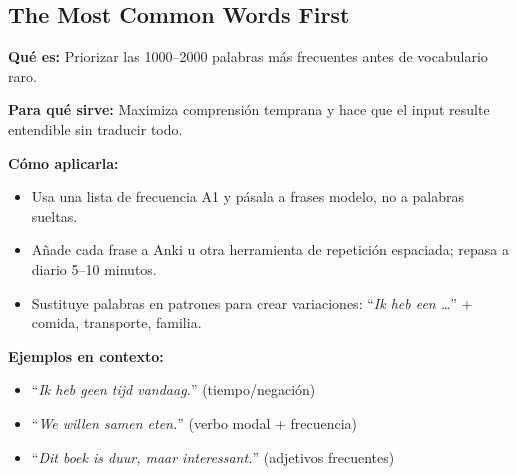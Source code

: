 \subsection*{The Most Common Words First}
\textbf{Qué es:} Priorizar las 1000--2000 palabras más frecuentes antes de vocabulario raro.

\textbf{Para qué sirve:} Maximiza comprensión temprana y hace que el input resulte entendible sin traducir todo.

\textbf{Cómo aplicarla:}
\begin{itemize}[leftmargin=*]
	\item Usa una lista de frecuencia A1 y pásala a frases modelo, no a palabras sueltas.
	\item Añade cada frase a Anki u otra herramienta de repetición espaciada; repasa a diario 5--10 minutos.
	\item Sustituye palabras en patrones para crear variaciones: \enquote{\textit{Ik heb een \ldots{}}} + comida, transporte, familia.
\end{itemize}

\textbf{Ejemplos en contexto:}
\begin{itemize}[leftmargin=*]
	\item \enquote{\textit{Ik heb geen tijd vandaag.}} (tiempo/negación)
	\item \enquote{\textit{We willen samen eten.}} (verbo modal + frecuencia)
	\item \enquote{\textit{Dit boek is duur, maar interessant.}} (adjetivos frecuentes)
\end{itemize}
